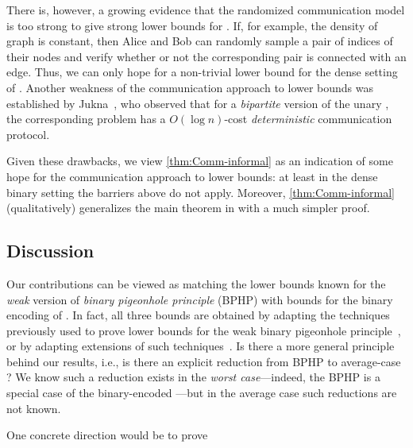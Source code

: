 There is, however, a growing evidence that the randomized communication model is too strong to give strong lower bounds for \kClique. If, for example, the density of \erdosrenyi graph is constant, then Alice and Bob can randomly sample a pair of indices of their nodes and verify whether or not the corresponding pair is connected with an edge. Thus, we can only hope for a non-trivial lower bound for the dense setting of \kClique. 
Another weakness of the communication approach to \kClique lower bounds was established by Jukna~\cite{Jukna12}, who observed that for a \emph{bipartite} version of the unary \kClique, the corresponding problem has a $O(\log n)$-cost \emph{deterministic} communication protocol.

Given these drawbacks, we view \cref{thm:Comm-informal} as an indication of some hope for the communication approach to \kClique lower bounds: at least in the dense binary setting the barriers above do not apply. Moreover, \cref{thm:Comm-informal} (qualitatively) generalizes the main theorem in \cite{YZ24Comm} with a much simpler proof.


\subsection{Discussion}

Our contributions can be viewed
as matching the lower bounds known for the \emph{weak} version of  \emph{binary pigeonhole principle} (BPHP) 
with bounds for the binary encoding of \kClique. 
In fact, all  three bounds are obtained by adapting 
the techniques previously used to prove lower bounds for the weak binary pigeonhole principle~\cite{BeameW2025multiparty,BI25bphp}, or by adapting extensions of such techniques~\cite{GoosGJL2025quantum,YZ24Comm}. 
Is there a more general principle behind our results, i.e., is there an explicit reduction from BPHP to average-case \kClique?
We know such a reduction exists in the \emph{worst case}---indeed, the BPHP is a special case of the binary-encoded \kClique---but in the average case such reductions are not known.



One concrete direction 
would be to prove 

